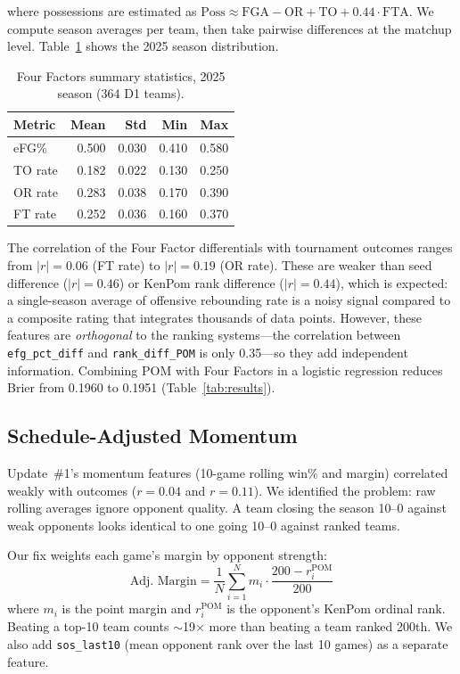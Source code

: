 \documentclass[11pt,a4paper]{article}
\begin{document}
\noindent where possessions are estimated as $\text{Poss} \approx \text{FGA} - \text{OR} + \text{TO} + 0.44 \cdot \text{FTA}$. We compute season averages per team, then take pairwise differences at the matchup level. Table~\ref{tab:four-factors} shows the 2025 season distribution.

\begin{table}[h]
\centering
\caption{Four Factors summary statistics, 2025 season (364 D1 teams).}
\label{tab:four-factors}
\small
\begin{tabular}{@{}lrrrr@{}}
\toprule
\textbf{Metric} & \textbf{Mean} & \textbf{Std} & \textbf{Min} & \textbf{Max} \\
\midrule
eFG\% & 0.500 & 0.030 & 0.410 & 0.580 \\
TO rate & 0.182 & 0.022 & 0.130 & 0.250 \\
OR rate & 0.283 & 0.038 & 0.170 & 0.390 \\
FT rate & 0.252 & 0.036 & 0.160 & 0.370 \\
\bottomrule
\end{tabular}
\end{table}

The correlation of the Four Factor differentials with tournament outcomes ranges from $|r| = 0.06$ (FT rate) to $|r| = 0.19$ (OR rate). These are weaker than seed difference ($|r| = 0.46$) or KenPom rank difference ($|r| = 0.44$), which is expected: a single-season average of offensive rebounding rate is a noisy signal compared to a composite rating that integrates thousands of data points. However, these features are \textit{orthogonal} to the ranking systems---the correlation between \texttt{efg\_pct\_diff} and \texttt{rank\_diff\_POM} is only 0.35---so they add independent information. Combining POM with Four Factors in a logistic regression reduces Brier from 0.1960 to 0.1951 (Table~\ref{tab:results}).


\subsection{Schedule-Adjusted Momentum}

Update~\#1's momentum features (10-game rolling win\% and margin) correlated weakly with outcomes ($r = 0.04$ and $r = 0.11$). We identified the problem: raw rolling averages ignore opponent quality. A team closing the season 10--0 against weak opponents looks identical to one going 10--0 against ranked teams.

Our fix weights each game's margin by opponent strength:
\begin{equation}
    \text{Adj.~Margin} = \frac{1}{N} \sum_{i=1}^{N} m_i \cdot \frac{200 - r_i^{\text{POM}}}{200}
    \label{eq:adj-momentum}
\end{equation}
where $m_i$ is the point margin and $r_i^{\text{POM}}$ is the opponent's KenPom ordinal rank. Beating a top-10 team counts $\sim$19$\times$ more than beating a team ranked 200th. We also add \texttt{sos\_last10} (mean opponent rank over the last 10 games) as a separate feature.
\end{document}
